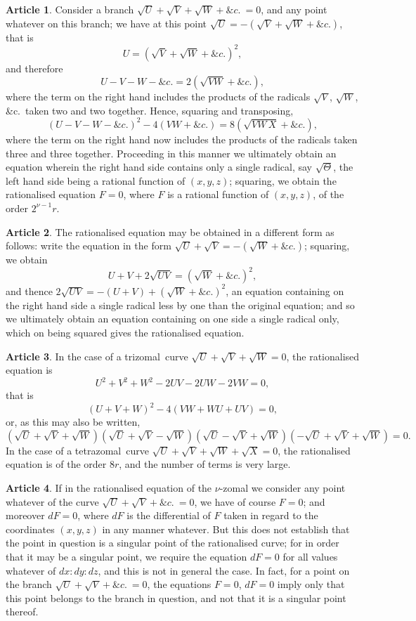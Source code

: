 \documentclass[11pt,a4paper]{article}
\theoremstyle{definition}
\newtheorem{art}{Article}
\newcommand{\trizomal}{trizomal}
\newcommand{\tetrazomal}{tetrazomal}
\begin{document}
\begin{art}
Consider a branch $\sqrt{U} + \sqrt{V} + \sqrt{W} + \&c.\ = 0$, and any point whatever on this branch; we have at this point $\sqrt{U} = -(\sqrt{V} + \sqrt{W} + \&c.)$, that is
\[
U = (\sqrt{V} + \sqrt{W} + \&c.)^{2},
\]
and therefore
\[
U - V - W - \&c. = 2(\sqrt{VW} + \&c.),
\]
where the term on the right hand includes the products of the radicals $\sqrt{V}$, $\sqrt{W}$, \&c.\ taken two and two together. Hence, squaring and transposing,
\[
(U - V - W - \&c.)^{2} - 4(VW + \&c.) = 8(\sqrt{VW\,X} + \&c.),
\]
where the term on the right hand now includes the products of the radicals taken three and three together. Proceeding in this manner we ultimately obtain an equation wherein the right hand side contains only a single radical, say $\sqrt{\Theta}$, the left hand side being a rational function of $(x, y, z)$; squaring, we obtain the rationalised equation $F = 0$, where $F$ is a rational function of $(x, y, z)$, of the order $2^{\nu-1}r$.
\end{art}

\begin{art}
The rationalised equation may be obtained in a different form as follows: write the equation in the form $\sqrt{U} + \sqrt{V} = -(\sqrt{W} + \&c.)$; squaring, we obtain
\[
U + V + 2\sqrt{UV} = (\sqrt{W} + \&c.)^{2},
\]
and thence $2\sqrt{UV} = -(U + V) + (\sqrt{W} + \&c.)^{2}$, an equation containing on the right hand side a single radical less by one than the original equation; and so we ultimately obtain an equation containing on one side a single radical only, which on being squared gives the rationalised equation.
\end{art}

\begin{art}
In the case of a \trizomal\ curve $\sqrt{U} + \sqrt{V} + \sqrt{W} = 0$, the rationalised equation is
\[
U^{2} + V^{2} + W^{2} - 2UV - 2UW - 2VW = 0,
\]
that is
\[
(U + V + W)^{2} - 4(VW + WU + UV) = 0,
\]
or, as this may also be written,
\[
(\sqrt{U} + \sqrt{V} + \sqrt{W})(\sqrt{U} + \sqrt{V} - \sqrt{W})(\sqrt{U} - \sqrt{V} + \sqrt{W})(-\sqrt{U} + \sqrt{V} + \sqrt{W}) = 0.
\]
In the case of a \tetrazomal\ curve $\sqrt{U} + \sqrt{V} + \sqrt{W} + \sqrt{X} = 0$, the rationalised equation is of the order $8r$, and the number of terms is very large.
\end{art}

\begin{art}
If in the rationalised equation of the $\nu$-zomal we consider any point whatever of the curve $\sqrt{U} + \sqrt{V} + \&c.\ = 0$, we have of course $F = 0$; and moreover $dF = 0$, where $dF$ is the differential of $F$ taken in regard to the coordinates $(x, y, z)$ in any manner whatever. But this does not establish that the point in question is a singular point of the rationalised curve; for in order that it may be a singular point, we require the equation $dF = 0$ for all values whatever of $dx : dy : dz$, and this is not in general the case. In fact, for a point on the branch $\sqrt{U} + \sqrt{V} + \&c.\ = 0$, the equations $F = 0$, $dF = 0$ imply only that this point belongs to the branch in question, and not that it is a singular point thereof.
\end{art}
\end{document}
